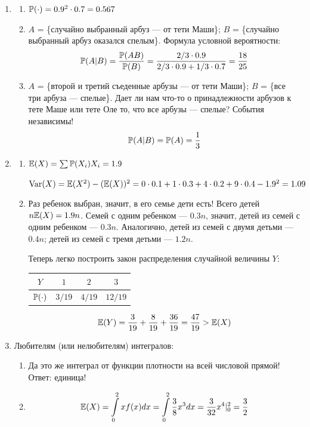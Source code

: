 \documentclass[12pt, a4paper]{article}\usepackage[]{graphicx}\usepackage[]{color}
\begin{document}
\begin{enumerate}
\item

\begin{enumerate}
\item $\P(\cdot) = 0.9^2\cdot 0.7 = 0.567  $
\item $A$ = \{случайно выбранный арбуз — от тети Маши\}; $B$ = \{случайно выбранный арбуз оказался спелым\}. Формула условной вероятности:
\[\P(A|B) = \frac{\P(AB)}{\P(B)}= \frac{2/3 \cdot 0.9}{2/3 \cdot 0.9 + 1/3 \cdot 0.7} =\frac{18}{25}\]
\item $A$ = \{второй и третий съеденные арбузы — от тети Маши\}; $B$ = \{все три арбуза — спелые\}. Дает ли нам что-то о принадлежности арбузов к тете Маше или тете Оле то, что все арбузы — спелые? События независимы!
\[\P(A|B) = \P(A) = \frac{1}{3}\]
\end{enumerate}

\item
\begin{enumerate}
\item $\E(X) = \sum \P(X_i) X_i = 1.9$

$\Var(X) = \E(X^2) - (\E(X))^2 = 0\cdot 0.1 + 1 \cdot 0.3 + 4 \cdot 0.2 + 9 \cdot 0.4 - 1.9^2 = 1.09$

\item Раз ребенок выбран, значит, в его семье дети есть! Всего детей $n\E(X) = 1.9n$. Семей с одним ребенком — $0.3n$, значит, детей из семей с одним ребенком — $0.3n$. Аналогично, детей из семей с двумя детьми — $0.4n$; детей из семей с тремя детьми — $1.2n$.

Теперь легко построить закон распределения случайной величины $Y$:

\begin{tabular}{cccc}
\toprule
$Y$ & $1$ & $2$ & $3$  \\ \midrule
$\P(\cdot)$ & $3/19$ & $4/19$ & $12/19$  \\ \bottomrule
\end{tabular}


\[\E(Y) = \frac{3}{19} + \frac{8}{19} + \frac{36}{19} = \frac{47}{19} > \E(X)\]

\end{enumerate}


\item
Любителям (или нелюбителям) интегралов:
\begin{enumerate}
\item Да это же интеграл от функции плотности на всей числовой прямой! Ответ: единица!
\item \[\E(X) = \int \limits_0^2 x f(x) dx = \int \limits_0^2 \frac{3}{8} x^3 dx = \frac{3}{32} x^4 |_0^2 = \frac{3}{2}\]


\end{enumerate}
\end{enumerate}
\end{document}
